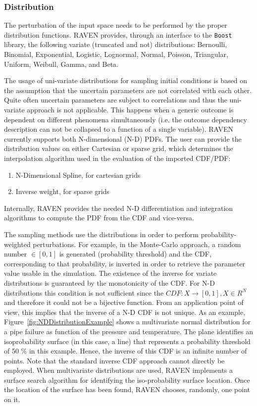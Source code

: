 \subsubsection{Distribution}
The perturbation of the input space  needs to be performed by the proper distribution functions. RAVEN provides, through an interface to the \texttt{Boost} library, the following variate (truncated and not) distributions: Bernoulli, Binomial, Exponential, Logistic, Lognormal, Normal, Poisson, Triangular, Uniform, Weibull, Gamma, and Beta.

The usage of uni-variate distributions for sampling initial conditions is based on the assumption that the uncertain parameters are not correlated with each other. Quite often uncertain parameters are subject to correlations and thus the uni-variate approach is not applicable. This happens when a generic outcome is dependent on different phenomena simultaneously (i.e. the outcome dependency description can not be collapsed to a function of a single variable). RAVEN currently supports both N-dimensional (N-D) PDFs. The user can provide the distribution values on either Cartesian or sparse grid, which determines the interpolation algorithm used in the evaluation of the imported CDF/PDF:
\begin{enumerate}
\item N-Dimensional Spline, for cartesian grids
\item Inverse weight, for sparse grids
\end{enumerate}
Internally, RAVEN provides the needed N-D differentiation and integration algorithms to compute the PDF from the CDF and vice-versa.

The sampling methods use the distributions in order to perform probability-weighted perturbations. For example, in the Monte-Carlo approach, a random number $\in [0,1]$ is generated (probability threshold) and the CDF, corresponding to that probability, is inverted in order to retrieve the parameter value usable in the simulation. The existence of the inverse for variate distributions is guaranteed by the monotonicity of the CDF. For N-D distributions this condition is not sufficient since the $CDF:X\longrightarrow [0,1],X \in  R^{N} $ and therefore it could not be a bijective function. From an application point of view, this implies that the inverse of a N-D CDF is not unique.
As an example, Figure~\ref{fig:NDDistributionExample} shows a multivariate normal distribution for a pipe failure as function of the pressure and temperature. The plane identifies an isoprobability surface (in this case, a line) that represents a probability threshold of 50 \% in this example.  Hence, the inverse of this CDF is an infinite number of points.
Note that the standard inverse CDF approach cannot directly be employed. When multivariate distributions are used, RAVEN implements a surface search algorithm for identifying the iso-probability surface location. Once the location of the surface has been found, RAVEN chooses, randomly, one point on it.

